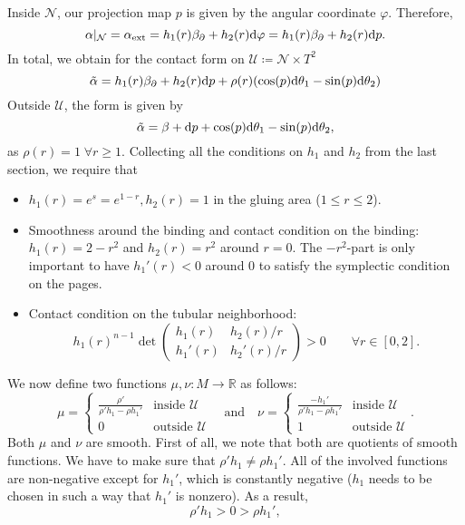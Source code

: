 Inside $\mathcal{N}$, our projection map $p$ is given by the angular coordinate $\varphi$. Therefore,
\[
    \alpha|_\mathcal{N} = \alpha_\text{ext} = h_1(r)\beta_\partial + h_2(r)\mathrm{d} \varphi = h_1(r)\beta_\partial + h_2(r)\mathrm{d} p.
\]
In total, we obtain for the contact form on $\mathcal{U} \coloneqq \mathcal{N}\times T^2$
\[
    \tilde \alpha = h_1(r)\beta_\partial + h_2(r)\mathrm{d} p + \rho(r)(\cos(p) \mathrm{d} \theta_1 - \sin(p) \mathrm{d} \theta_2)
\]
Outside $\mathcal{U}$, the form is given by
\[
    \tilde \alpha = \beta + \mathrm{d} p + \cos(p) \mathrm{d}\theta_1 - \sin(p) \mathrm{d} \theta_2,
\]
as $\rho(r) = 1\; \forall r \geq 1$.
Collecting all the conditions on $h_1$ and $h_2$ from the last section, we require that
\begin{itemize}
    \item $h_1(r) = e^s = e^{1-r}, h_2(r) = 1$ in the gluing area ($ 1 \le r \le 2$).
    \item Smoothness around the binding and contact condition on the binding: $h_1(r) = 2 - r^2$ and $h_2(r) = r^2$ around $r = 0$.
    The $-r^2$-part is only important to have $h_1'(r) < 0$ around $0$ to satisfy the symplectic condition on the pages.
    \item Contact condition on the tubular neighborhood: \[
        h_1(r)^{n-1}\det \begin{pmatrix}
            h_1(r) & h_2(r)/r\\
            h_1'(r) & h_2'(r)/r
        \end{pmatrix} > 0 \qquad \forall r \in [0,2].
    \]
\end{itemize}
We now define two functions $\mu, \nu: M \to \mathbb R$ as follows:
\[
    \mu = \begin{cases}
        \frac{\rho'}{\rho' h_1 - \rho h_1'} &\text{inside } \mathcal{U}\\
        0 &\text{outside } \mathcal{U} 
    \end{cases}  
    \quad \text{and} \quad 
    \nu = \begin{cases}
        \frac{-h_1'}{\rho' h_1 - \rho h_1'} &\text{inside } \mathcal{U}\\
        1 &\text{outside } \mathcal{U}
    \end{cases}.
\]
Both $\mu$ and $\nu$ are smooth.
First of all, we note that both are quotients of smooth functions.
We have to make sure that $\rho'h_1 \neq \rho h_1'$.
All of the involved functions are non-negative except for $h_1'$, which is constantly negative ($h_1$ needs to be chosen in such a way that $h_1'$ is nonzero). As a result,
\[
    \rho'h_1 > 0 > \rho h_1',
\]
